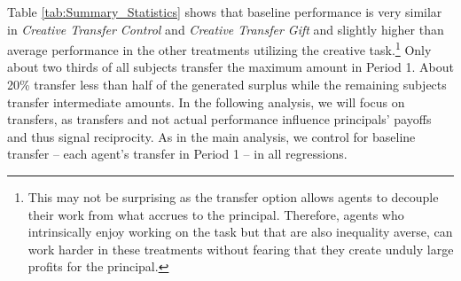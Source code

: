  Table \ref{tab:Summary_Statistics} shows that baseline performance 
is very similar in \textit{Creative Transfer Control} 
and \textit{Creative Transfer Gift} and slightly 
higher than average performance in the other treatments utilizing the creative task.\footnote{This
 may not be surprising as the transfer option allows agents to 
decouple their work from what accrues to the principal. Therefore, 
agents who intrinsically enjoy working on the task but that are also inequality averse, 
can work harder in these treatments without 
fearing that they create unduly large profits for the principal.}
Only about two thirds of all subjects transfer the maximum amount in Period 1. 
About 20\% transfer less than half of the generated surplus while the remaining 
subjects transfer intermediate amounts. 
In the following analysis, we will  focus on transfers, as transfers and not actual performance 
influence principals' payoffs and thus signal reciprocity.
As in the main analysis, we control for baseline transfer -- each agent's transfer in Period 1 --
in all regressions. 

